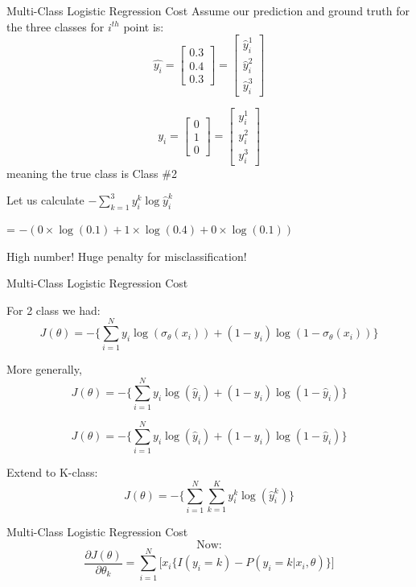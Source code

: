 \documentclass{beamer}
\begin{document}
\begin{frame}{Multi-Class Logistic Regression Cost}
Assume our prediction and ground truth  for the three classes for $i^{th}$ point is:
$$
\hat{y_i} = \begin{bmatrix}
0.3\\0.4\\0.3
\end{bmatrix} = \begin{bmatrix}
\hat{y}_i^1\\\hat{y}_i^2\\\hat{y}_i^3
\end{bmatrix} 
$$

$$
y_i = \begin{bmatrix}
0\\1\\0
\end{bmatrix}=\begin{bmatrix}
y_i^1\\y_i^2\\ y_i^3
\end{bmatrix}
$$
meaning the true class is Class \#2

\pause Let us calculate $-\sum_{k=1}^{3}y_i^k \log{\hat{y}_i^k} $

\pause  = $-(0\times \log(0.1) + 1\times \log(0.4) + 0\times \log(0.1))$

\pause High number! Huge penalty for misclassification!

\end{frame}

\begin{frame}{Multi-Class Logistic Regression Cost}


For 2 class we had:
\begin{equation*}
J(\theta) = -\bigg\{\sum_{i=1}^{N}y_{i}\log(\sigma_{\theta}(x_{i})) + (1 - y_{i})\log(1 - \sigma_{\theta}(x_{i}))\bigg\}
\end{equation*}

\pause More generally, 
\pause \begin{equation*}
J(\theta) = -\bigg\{\sum_{i=1}^{N}y_{i}\log(\hat{y}_i) + (1 - y_{i})\log(1 - \hat{y}_i)\bigg\}
\end{equation*}

\pause \begin{equation*}
J(\theta) = -\bigg\{\sum_{i=1}^{N}y_{i}\log(\hat{y}_i) + (1 - y_{i})\log(1 - \hat{y}_i)\bigg\}
\end{equation*}

Extend to K-class:
\begin{equation*}
J(\theta) = -\bigg\{\sum_{i=1}^{N}\sum_{k=1}^{K}y_{i}^k\log(\hat{y}_{i}^k)\bigg\}
\end{equation*}
\end{frame}
\begin{frame}{Multi-Class Logistic Regression Cost}
\begin{equation*}
\text{Now:}
\end{equation*}
\begin{equation*}
\frac{\partial J(\theta)}{\partial \theta_{k}} = \sum_{i=1}^{N}\bigg[x_{i}\bigg\{I(y_{i} = k) - P(y_{i} = k | x_{i}, \theta)\bigg\}\bigg]
\end{equation*}
\end{frame}
\end{document}
